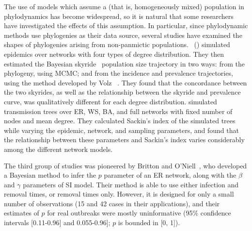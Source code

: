 The use of models which assume a  (that is, homogeneously
mixed) population in phylodynamics has become widespread, so it is natural that
some researchers have investigated the effects of this assumption. In
particular, since phylodynamic methods use phylogenies as their data source,
several studies have examined the shapes of phylogenies arising from
non-panmictic populations. \citeauthor{o2010contact}~(\citeyear{o2010contact})
simulated epidemics over networks with four types of degree distribution. They
then estimated the Bayesian skyride~\autocite{minin2008smooth} population size
trajectory in two ways: from the phylogeny, using \gls{MCMC}; and from the
incidence and prevalence trajectories, using the method developed by Volz
\etal~\autocite{volz2009phylodynamics}. They found that the concordance between
the two skyrides, as well as the relationship between the skyride and
prevalence curve, was qualitatively different for each degree distribution.
\citeauthor{leventhal2012inferring} simulated transmission trees over \gls{ER},
\gls{WS}, \gls{BA}, and full networks with fixed number of nodes and mean degree.
They calculated Sackin's index of the simulated trees while varying the
epidemic, network, and sampling parameters, and found that the relationship
between these parameters and Sackin's index varies considerably among the
different network models.

The third group of studies was pioneered by Britton and
O'Niell~\autocite{britton2002bayesian}, who developed a Bayesian method to
infer the $p$ parameter of an \gls{ER} network, along with the $\beta$ and
$\gamma$ parameters of \gls{SI} model. Their method is able to use either
infection and removal times, or removal times only. However, it is designed for
only a small number of observations (15 and 42 cases in their applications),
and their estimates of $p$ for real outbreaks were mostly uninformative (95\%
confidence intervals [0.11-0.96] and 0.055-0.96]; $p$ is bounded in [0, 1]).
